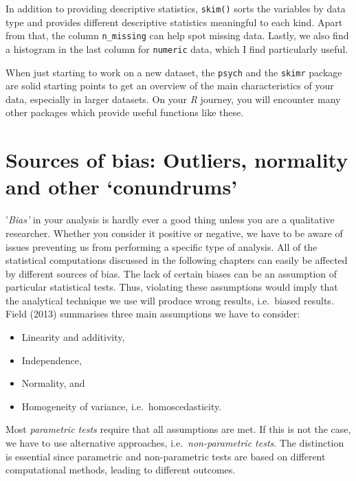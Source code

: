 \documentclass[
  letterpaper,
]{krantz}
\begin{document}
In addition to providing descriptive statistics, \texttt{skim()} sorts
the variables by data type and provides different descriptive statistics
meaningful to each kind. Apart from that, the column \texttt{n\_missing}
can help spot missing data. Lastly, we also find a histogram in the last
column for \texttt{numeric} data, which I find particularly useful.

When just starting to work on a new dataset, the \texttt{psych} and the
\texttt{skimr} package are solid starting points to get an overview of
the main characteristics of your data, especially in larger datasets. On
your \emph{R} journey, you will encounter many other packages which
provide useful functions like these.


\chapter{Sources of bias: Outliers, normality and other
`conundrums'}\label{sec-sources-of-bias}

'\emph{Bias'} in your analysis is hardly ever a good thing unless you
are a qualitative researcher. Whether you consider it positive or
negative, we have to be aware of issues preventing us from performing a
specific type of analysis. All of the statistical computations discussed
in the following chapters can easily be affected by different sources of
bias. The lack of certain biases can be an assumption of particular
statistical tests. Thus, violating these assumptions would imply that
the analytical technique we use will produce wrong results, i.e.~biased
results. Field (2013) summarises three main assumptions we have to
consider:

\begin{itemize}
\item
  Linearity and additivity,
\item
  Independence,
\item
  Normality, and
\item
  Homogeneity of variance, i.e.~homoscedasticity.
\end{itemize}

Most \emph{parametric tests} require that all assumptions are met. If
this is not the case, we have to use alternative approaches,
i.e.~\emph{non-parametric tests}. The distinction is essential since
parametric and non-parametric tests are based on different computational
methods, leading to different outcomes.
\end{document}

